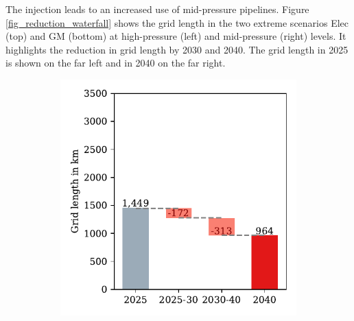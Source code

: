 The injection leads to an increased use of mid-pressure pipelines. Figure \ref{fig_reduction_waterfall} shows the grid length in the two extreme scenarios Elec (top) and GM (bottom) at high-pressure (left) and mid-pressure (right) levels. It highlights the reduction in grid length by 2030 and 2040. The grid length in 2025 is shown on the far left and in 2040 on the far right. 

\begin{figure}[h]
	\begin{subfigure}[c]{0.5\textwidth}
		\centering
		\includegraphics[width=1\linewidth]{figures/results/waterfall/waterfall_elec_high.pdf}
		\vspace{-0.6cm}
		\label{Fig:a}
	\end{subfigure}
	\begin{subfigure}[c]{0.5\textwidth}
		\centering

\end{subfigure}
\end{figure}
